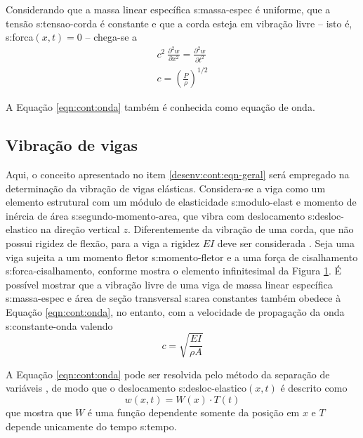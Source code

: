 \documentclass[12pt,openright,oneside,a4paper,
	chapter=TITLE,section=TITLE,
	english,brazil]{abntex2}
\begin{document}
	Considerando que a massa linear específica \gls{s:massa-espec} é uniforme, que a tensão \gls{s:tensao-corda} é constante e que a corda esteja em vibração livre -- isto é, \gls{s:forca}$(x,t) = 0$ -- chega-se a \cite{rao:2008}
	\begin{align}
		\mathit{c}^2\:\frac{\partial^2 w}{\partial x^2}=\frac{\partial^2 w}{\partial t^2} \label{eqn:cont:onda}\\
		\mathit{c} = \left(\frac{P}{\rho}\right)^{1/2}
	\end{align}
	
	A Equação \ref{eqn:cont:onda} também é conhecida como equação de onda. 
	
	\subsection{Vibração de vigas} \label{sec:vigas}
	Aqui, o conceito apresentado no item \ref{desenv:cont:eqn-geral} será empregado na determinação da vibração de vigas elásticas. Considera-se a viga como um elemento estrutural com um módulo de elasticidade \gls{s:modulo-elast} e momento de inércia de área \gls{s:segundo-momento-area}, que vibra com deslocamento \gls{s:desloc-elastico} na direção vertical $z$. Diferentemente da vibração de uma corda, que não possui rigidez de flexão, para a viga a rigidez $EI$ deve ser considerada \cite{timoshenko:1974}. Seja uma viga sujeita a um momento fletor \gls{s:momento-fletor} e a uma força de cisalhamento \gls{s:forca-cisalhamento}, conforme mostra o elemento infinitesimal da Figura \ref{fig:elemento-viga}. É possível mostrar que a vibração livre de uma viga de massa linear específica \gls{s:massa-espec} e área de seção transversal \gls{s:area} constantes também obedece à Equação \ref{eqn:cont:onda}, no entanto, com a velocidade de propagação da onda \gls{s:constante-onda} valendo \cite{rao:2008}
	\begin{equation}
		\mathit{c} = \sqrt{\frac{EI}{\rho A}}
	\end{equation}		
	\begin{figure}[t]
		\label{fig:elemento-viga}
	\end{figure}

	A Equação \ref{eqn:cont:onda} pode ser resolvida pelo método da separação de variáveis \cite{clark:1972}, de modo que o deslocamento \gls{s:desloc-elastico}$(x,t)$ é descrito como
	\begin{equation} \label{eqn:cont:sep-variaveis}
		w(x,t) = W(x)\cdot T(t)
	\end{equation}
	que mostra que $ W $ é uma função dependente somente da posição em $x$ e $ T $ depende unicamente do tempo \gls{s:tempo}.
	
\end{document}
